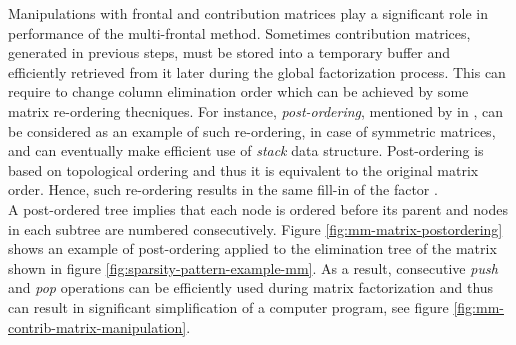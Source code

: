 Manipulations with frontal and contribution matrices play a significant role in performance of the multi-frontal method. Sometimes contribution matrices, generated in previous steps, must be stored into a temporary buffer and efficiently retrieved from it later during the global factorization process. This can require to change column elimination order which can be achieved by some matrix re-ordering thecniques. For instance, \textit{post-ordering}, mentioned by \citeauthor{mult-frontal-original:2} in \cite{mult-frontal-original:2}, can be considered as an example of such re-ordering, in case of symmetric matrices, and can eventually make efficient use of \textit{stack} data structure. Post-ordering is based on topological ordering and thus it is equivalent to the original matrix order. Hence,  such re-ordering results in the same fill-in of the factor \cite{mult-frontal-original:2}.\\








A post-ordered tree implies that each node is ordered before its parent and nodes in each subtree are numbered consecutively. Figure \ref{fig:mm-matrix-postordering} shows an example of post-ordering applied to the elimination tree of the matrix shown in figure \ref{fig:sparsity-pattern-example-mm}. As a result, consecutive \textit{push} and \textit{pop} operations can be efficiently used during matrix factorization and thus can result in significant simplification of a computer program, see figure \ref{fig:mm-contrib-matrix-manipulation}.



